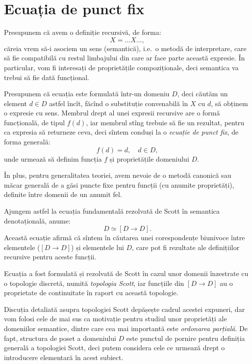 \section{Ecuația de punct fix}

\indent\indent Presupunem că avem o definiție recursivă, de forma:
\[
  X = \dots X \dots,
\]
căreia vrem să-i asociem un sens (semantică), i.e.\ o metodă de interpretare, care
să fie compatibilă cu restul limbajului din care ar face parte această expresie.
În particular, vom fi interesați de proprietățile compoziționale, deci semantica
va trebui să fie dată funcțional.

Presupunem că ecuația este formulată într-un domeniu $ D $, deci căutăm
un element $ d \in D $ astfel încît, făcînd o substituție convenabilă
în $ X $ cu $ d $, să obținem o expresie cu sens. Membrul drept al unei
expresii recursive are o formă funcțională, de tipul $ f(d) $, iar membrul
stîng trebuie să fie un rezultat, pentru ca expresia să returneze ceva,
deci sîntem conduși la o \emph{ecuație de punct fix}, de forma generală:
\[
  f(d) = d, \quad d \in D,
\]
unde urmează să definim funcția $ f $ și proprietățile domeniului $ D $.

În plus, pentru generalitatea teoriei, avem nevoie de o metodă canonică
sau măcar generală de a găsi puncte fixe pentru funcții (cu anumite proprietăți),
definite între domenii de un anumit fel.

Ajungem astfel la ecuația fundamentală rezolvată de Scott în semantica denotațională,
anume:
\[
  D \simeq [ D \to D ].
\]
Această ecuație afirmă că sîntem în căutarea unei corespondențe biunivoce
între elementele  ($ [D \to D] $) și elementele
lui $ D $, care pot fi rezultate ale definițiilor recursive pentru aceste
funcții.

Ecuația a fost formulată și rezolvată de Scott în cazul unor domenii
înzestrate cu o topologie discretă, numită \emph{topologia Scott}, iar
funcțiile din $ [D \to D] $ au o proprietate de continuitate în
raport cu această topologie.

Discuția detaliată asupra topologiei Scott depășește cadrul acestei
expuneri, dar vom folosi cele de mai sus ca motivație pentru studiul
unor proprietăți ale domeniilor semantice, dintre care cea mai importantă
este \emph{ordonarea parțială}. De fapt, structura de poset a domeniului $ D $
este punctul de pornire pentru definiția generală a topologiei Scott, deci
putem considera cele ce urmează drept o introducere elementară în acest subiect.

